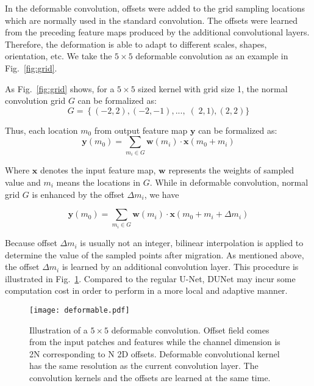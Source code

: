 \documentclass[journal]{IEEEtran}
\begin{document}
In the deformable convolution, offsets were added to the grid sampling locations which are normally used in the standard convolution. The offsets were learned from the preceding feature maps produced by the additional convolutional layers. Therefore, the deformation is able to adapt to different scales, shapes, orientation, etc. We take the $5 \times 5$ deformable convolution as an example in Fig.~\ref{fig:grid}.

As Fig.~\ref{fig:grid} shows, for a $5 \times 5$ sized kernel with grid size 1, the normal convolution grid $G$ can be formalized as:
\setlength{\abovedisplayshortskip}{0pt}
\setlength{\belowdisplayshortskip}{0pt}
\begin{equation}
G=\left \{ (-2,2),(-2,-1),..., \right (2,1),(2,2) \}
\label{eq:grid}
\end{equation}

Thus, each location $m_0$ from output feature map $\mathbf{y}$ can be formalized as:
\setlength{\abovedisplayshortskip}{0pt}
\setlength{\belowdisplayshortskip}{0pt}
\begin{equation}
\mathbf{y}(m_{0})=\sum_{m_{i}\in G}\mathbf{w}(m_{i}) \cdot \mathbf{x}(m_{0}+m_{i})
\label{eq:y_m_0}
\end{equation}


Where $\mathbf{x}$ denotes the input feature map, $\mathbf{w}$ represents the weights of sampled value and $m_{i}$ means the locations in $G$. While in deformable convolution, normal grid $G$ is enhanced by the offset $\Delta m_{i}$, we have

\setlength{\abovedisplayshortskip}{0pt}
\setlength{\belowdisplayshortskip}{0pt}
\begin{equation}
\mathbf{y}(m_{0})=\sum_{m_{i}\in G}\mathbf{w}(m_{i}) \cdot \mathbf{x}(m_{0}+m_{i} +\Delta m_{i})
\label{eq:y_delta_m_0}
\end{equation}

Because offset $\Delta m_{i}$ is usually not an integer, bilinear interpolation is applied to determine the value of the sampled points after migration. As mentioned above, the offset $\Delta m_{i}$ is learned by an additional convolution layer. This procedure is illustrated in Fig.~\ref{fig:deformable}. Compared to the regular U-Net, DUNet may incur some computation cost in order to perform in a more local and adaptive manner.

\begin{figure}
\centering
\texttt{[image: deformable.pdf]}
\caption{Illustration of a $5 \times 5$ deformable convolution. Offset field comes from the input patches and features while the channel dimension is 2N corresponding to N 2D offsets. Deformable convolutional kernel has the same resolution as the current convolution layer. The convolution kernels and the offsets are learned at the same time.}
\label{fig:deformable}
\end{figure}
\end{document}
